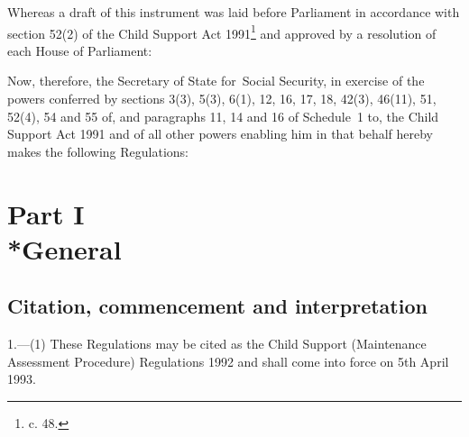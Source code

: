 \documentclass[a4paper,12pt]{article}
\title{\regstitle}
\author{S.I.~1992 No.~1813}
\date{Made 20th July 1992\\Coming into force 5th April 1993}
\begin{document}
\maketitle


\medskip

\noindent
 Whereas a draft of this instrument was laid before Parliament in accordance with section 52(2) of the Child Support Act 1991\footnote{ c. 48.} and approved by a resolution of each House of Parliament:

 Now, therefore, the Secretary of State for~Social Security, in exercise of the powers conferred by sections 3(3), 5(3), 6(1), 12, 16, 17, 18, 42(3), 46(11), 51, 52(4), 54 and 55 of, and paragraphs 11, 14 and 16 of Schedule~1 to, the Child Support Act 1991 and of all other powers enabling him in that behalf hereby makes the following Regulations:

{\sloppy

\tableofcontents

}

\setcounter{secnumdepth}{-2}

\section[Part I --- General]{Part I\\*General}

\renewcommand\parthead{--- Part I}

\subsection[1. Citation, commencement and interpretation]{Citation, commencement and interpretation}

1.—(1) These Regulations may be cited as the Child Support (Maintenance Assessment Procedure) Regulations 1992 and shall come into force on 5th April 1993.
\end{document}
